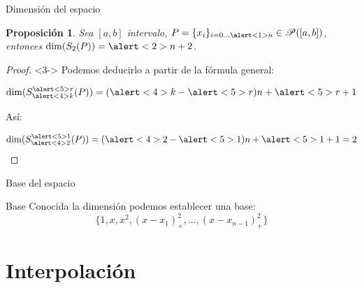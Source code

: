 \documentclass[compress]{beamer}
\newtheorem*{proposicion}{Proposición}
\theoremstyle{definition}
\theoremstyle{remark}
\begin{document}
\begin{frame}{Dimensión del espacio}
\begin{proposicion}
Sea $[a,b]$ intervalo, $P = \{x_i\}_{i=0...\alert<1>{n}} \in \mathscr{P}([a,b])$,
entonces $\dim(S_2(P)) = \alert<2>{n+2}$.
\end{proposicion}
\begin{proof}<3->
Podemos deducirlo a partir de la fórmula general:

\[
\dim(S_{\alert<4>{k}}^{\alert<5>{r}}(P)) = (\alert<4>{k} - \alert<5>{r})n
+ \alert<5>{r} + 1
\]

Así:

\[\dim(S_{\alert<4>{2}}^{\alert<5>{1}}(P)) = (\alert<4>{2} - \alert<5>{1})n + \alert<5>{1} + 1 = 2\]
\end{proof}
\end{frame}

\begin{frame}{Base del espacio}
\begin{block}{Base}
Conocida la dimensión podemos establecer una base:
\[\{1, x, x^2, (x-x_1)_+^2, ... , (x-x_{n-1})_+^2\}\]
\end{block}
\end{frame}

\section{Interpolación}
\end{document}
